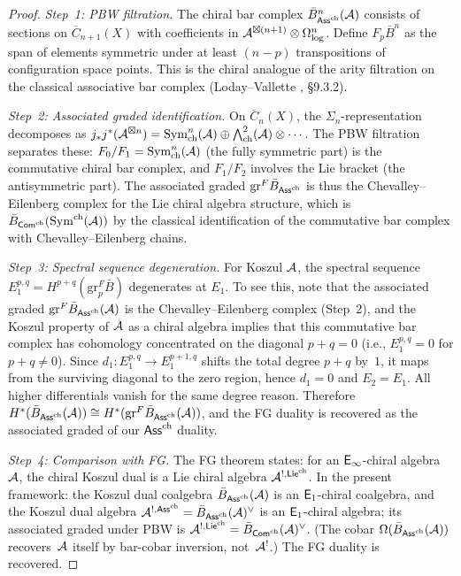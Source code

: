 \begin{proof}
\emph{Step~1: PBW filtration.}
The chiral bar complex $\bar{B}^n_{\mathsf{Ass}^{\mathrm{ch}}}(\mathcal{A})$ consists of sections on $\overline{C}_{n+1}(X)$ with coefficients in $\mathcal{A}^{\boxtimes(n+1)} \otimes \Omega^n_{\log}$.  Define $F_p \bar{B}^n$ as the span of elements symmetric under at least $(n-p)$ transpositions of configuration space points.  This is the chiral analogue of the arity filtration on the classical associative bar complex (Loday--Vallette \cite{LV12}, \S9.3.2).

\emph{Step~2: Associated graded identification.}
On $\overline{C}_n(X)$, the $\Sigma_n$-representation decomposes as $j_*j^*(\mathcal{A}^{\boxtimes n}) = \mathrm{Sym}^n_{\mathrm{ch}}(\mathcal{A}) \oplus \bigwedge^2_{\mathrm{ch}}(\mathcal{A}) \otimes \cdots$.  The PBW filtration separates these: $F_0/F_1 = \mathrm{Sym}^n_{\mathrm{ch}}(\mathcal{A})$ (the fully symmetric part) is the commutative chiral bar complex, and $F_1/F_2$ involves the Lie bracket (the antisymmetric part).  The associated graded $\mathrm{gr}^F \bar{B}_{\mathsf{Ass}^{\mathrm{ch}}}$ is thus the Chevalley--Eilenberg complex for the Lie chiral algebra structure, which is $\bar{B}_{\mathsf{Com}^{\mathrm{ch}}}(\mathrm{Sym}^{\mathrm{ch}}(\mathcal{A}))$ by the classical identification of the commutative bar complex with Chevalley--Eilenberg chains.

\emph{Step~3: Spectral sequence degeneration.}
For Koszul $\mathcal{A}$, the spectral sequence $E_1^{p,q} = H^{p+q}(\mathrm{gr}^F_p \bar{B})$ degenerates at $E_1$.  To see this, note that the associated graded $\mathrm{gr}^F \bar{B}_{\mathsf{Ass}^{\mathrm{ch}}}(\mathcal{A})$ is the Chevalley--Eilenberg complex (Step~2), and the Koszul property of $\mathcal{A}$ as a chiral algebra implies that this commutative bar complex has cohomology concentrated on the diagonal $p + q = 0$ (i.e., $E_1^{p,q} = 0$ for $p + q \neq 0$).  Since $d_1\colon E_1^{p,q} \to E_1^{p+1,q}$ shifts the total degree $p+q$ by~$1$, it maps from the surviving diagonal to the zero region, hence $d_1 = 0$ and $E_2 = E_1$.  All higher differentials vanish for the same degree reason.  Therefore $H^*(\bar{B}_{\mathsf{Ass}^{\mathrm{ch}}}(\mathcal{A})) \cong H^*(\mathrm{gr}^F \bar{B}_{\mathsf{Ass}^{\mathrm{ch}}}(\mathcal{A}))$, and the FG duality is recovered as the associated graded of our $\mathsf{Ass}^{\mathrm{ch}}$ duality.

\emph{Step~4: Comparison with FG.}
The FG theorem states: for an $\mathsf{E}_{\infty}$-chiral algebra $\mathcal{A}$, the chiral Koszul dual is a Lie chiral algebra $\mathcal{A}^{!,\mathsf{Lie}^{\mathrm{ch}}}$.  In the present framework: the Koszul dual coalgebra $\bar{B}_{\mathsf{Ass}^{\mathrm{ch}}}(\mathcal{A})$ is an $\mathsf{E}_1$-chiral coalgebra, and the Koszul dual algebra $\mathcal{A}^{!,\mathsf{Ass}^{\mathrm{ch}}} = \bar{B}_{\mathsf{Ass}^{\mathrm{ch}}}(\mathcal{A})^\vee$ is an $\mathsf{E}_1$-chiral algebra; its associated graded under PBW is $\mathcal{A}^{!,\mathsf{Lie}^{\mathrm{ch}}} = \bar{B}_{\mathsf{Com}^{\mathrm{ch}}}(\mathcal{A})^\vee$.  (The cobar $\Omega(\bar{B}_{\mathsf{Ass}^{\mathrm{ch}}}(\mathcal{A}))$ recovers~$\mathcal{A}$ itself by bar-cobar inversion, not~$\mathcal{A}^!$.)  The FG duality is recovered.
\end{proof}

